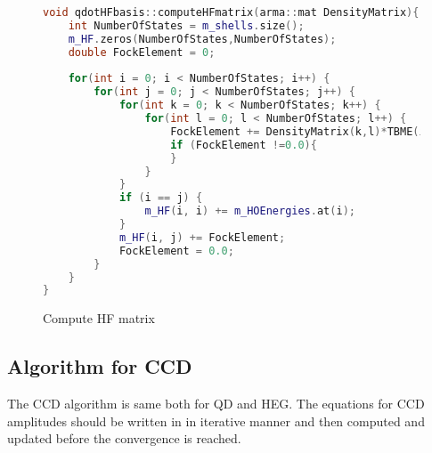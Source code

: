 \documentclass[twoside,english]{uiofysmaster}
\theoremstyle{definition}
\begin{document}
\begin{figure}
\begin{lstlisting}[language=C++]
void qdotHFbasis::computeHFmatrix(arma::mat DensityMatrix){
	int NumberOfStates = m_shells.size();
	m_HF.zeros(NumberOfStates,NumberOfStates);
	double FockElement = 0;
	
	for(int i = 0; i < NumberOfStates; i++) {
		for(int j = 0; j < NumberOfStates; j++) {
			for(int k = 0; k < NumberOfStates; k++) {
				for(int l = 0; l < NumberOfStates; l++) {
					FockElement += DensityMatrix(k,l)*TBME(i,k,j,l);
					if (FockElement !=0.0){
					}
				}
			}
			if (i == j) {
				m_HF(i, i) += m_HOEnergies.at(i);
			}
			m_HF(i, j) += FockElement;
			FockElement = 0.0;
		}
	}
}
\end{lstlisting}
\caption{Compute HF matrix}
\end{figure}
\subsection{Algorithm for CCD}
The CCD algorithm is same both for QD and HEG. The equations for CCD amplitudes should be written in in iterative manner and then computed and updated before the convergence is reached.\\
\end{document}
